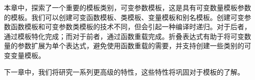 本章中，探索了一个重要的模板类别，可变参数模板，这是具有可变数量模板参数的模板。我们可以创建可变函数模板、类模板、变量模板和别名模板。创建可变参数函数模板和可变参数类模板的技术不同，但会引起一种编译时递归。对于后者，通过模板特化完成；而对于前者，通过函数重载完成。折叠表达式有助于将可变数量的参数扩展为单个表达式，避免使用函数重载的需要，并支持创建一些类别的可变变量模板。

下一章中，我们将研究一系列更高级的特性，这些特性将巩固对于模板的了解。